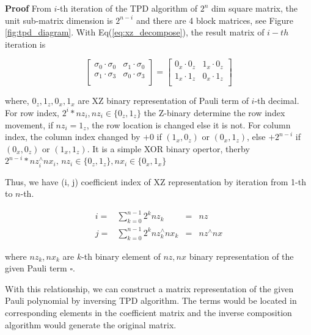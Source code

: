 \documentclass[twocolumn]{article}
\begin{document}
\textbf{Proof} 
From $i$-th iteration of the TPD algorithm of $2^n$ dim square matrix, 
the unit sub-matrix dimension is $2^{n-i}$ and there are 4 block matrices, see Figure \ref{fig:tpd_diagram}.
With Eq(\ref{eq:xz_decompose}), the result matrix of $i-th$ iteration is

\begin{equation}
    \begin{bmatrix}
        \sigma_0 \cdot \sigma_0 & \sigma_1 \cdot \sigma_0\\
        \sigma_1 \cdot \sigma_3 & \sigma_0 \cdot \sigma_3\\
    \end{bmatrix}
    = 
    \begin{bmatrix}
        0_x \cdot 0_z & 1_x \cdot 0_z\\
        1_x \cdot 1_z & 0_x \cdot 1_z\\
    \end{bmatrix}
\end{equation}

where, $0_z, 1_z, 0_x, 1_x$ are XZ binary representation of Pauli term of $i$-th decimal.
For row index, $2^{i} * nz_i, nz_i\in \{0_z, 1_z\}$ the Z-binary determine
the row index movement, if $nz_i = 1_z$, the row location is changed else it is not.
For column index, the column index changed by $+0$ if $(1_x, 0_z)$ or $(0_x, 1_z)$, 
else $+2^{n-i}$ if $(0_x, 0_z)$ or $(1_x, 1_z)$.
It is a simple XOR binary opertor, therby 
$2^{n-i} * nz_i^{\wedge}nx_i, \, nz_i\in \{0_z, 1_z\}, nx_i \in \{0_x, 1_x\}$

Thus, we have (i, j) coefficient index of XZ representation by iteration from 1-th to $n$-th. 

\begin{equation}
    \begin{array}{clcc}
    i =& \sum_{k=0}^{n-1} 2^{k} nz_k &=& nz\\
    j =& \sum_{k=0}^{n-1} 2^{k} nz_k^{\wedge} nx_k &=& nz^{\wedge}nx
    \end{array}
\end{equation}

where $nz_k, nx_k$ are $k$-th binary element of $nz, nx$ binary representation of the given Pauli term $\square$.

With this relationship, we can construct a matrix representation of the given Pauli polynomial
by inversing TPD algorithm. 
The terms would be located in corresponding elements in 
the coefficient matrix and the inverse composition algorithm would generate the original matrix.
\end{document}

